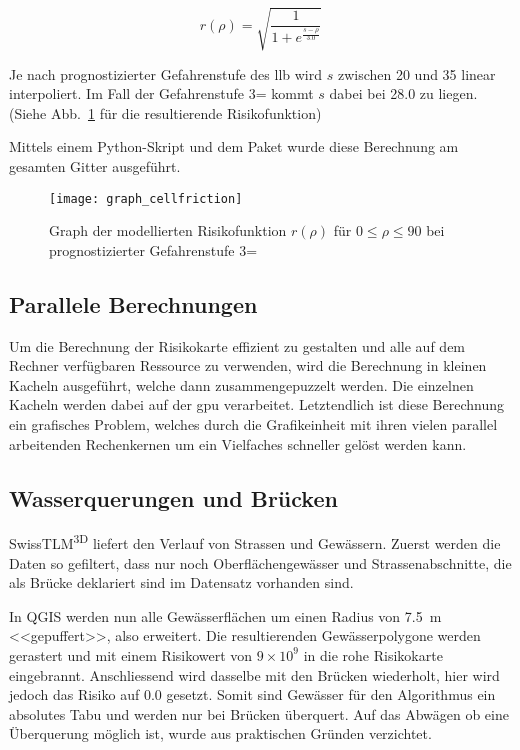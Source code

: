 \[
r(\rho) = \sqrt{\frac{1}{1 + e^{\frac{s-\rho}{3.0}}}}
\]

Je nach prognostizierter Gefahrenstufe des \gls{llb} wird $s$ zwischen 20 und 35 linear interpoliert. Im Fall der Gefahrenstufe 3= kommt $s$ dabei bei 28.0 zu liegen. (Siehe Abb.~\ref{fig:graph} für die resultierende Risikofunktion)

Mittels einem Python-Skript und dem Paket  wurde diese Berechnung am gesamten Gitter ausgeführt.

\begin{figure}[H]
  \centering
  \texttt{[image: graph\_cellfriction]}
  \caption{Graph der modellierten Risikofunktion $r(\rho)$ für $0 \leq \rho \leq 90$ bei prognostizierter Gefahrenstufe 3=}\label{fig:graph}
\end{figure}

\subsection{Parallele Berechnungen}

Um die Berechnung der Risikokarte effizient zu gestalten und alle auf dem Rechner verfügbaren Ressource zu verwenden, wird die Berechnung in kleinen Kacheln ausgeführt, welche dann zusammengepuzzelt werden. Die einzelnen Kacheln werden dabei auf der \acrshort{gpu} verarbeitet. Letztendlich ist diese Berechnung ein grafisches Problem, welches durch die Grafikeinheit mit ihren vielen parallel arbeitenden Rechenkernen um ein Vielfaches schneller gelöst werden kann.

\subsection{Wasserquerungen und Brücken}

SwissTLM\textsuperscript{3D} liefert den Verlauf von Strassen und Gewässern. Zuerst werden die Daten so gefiltert, dass nur noch Oberflächengewässer und Strassenabschnitte, die als Brücke deklariert sind im Datensatz vorhanden sind.

In QGIS werden nun alle Gewässerflächen um einen Radius von \qty{7.5}{m} <<gepuffert>>, also erweitert. Die resultierenden Gewässerpolygone werden gerastert und mit einem Risikowert von $9 \times 10^{9}$ in die rohe Risikokarte eingebrannt. Anschliessend wird dasselbe mit den Brücken wiederholt, hier wird jedoch das Risiko auf $0.0$ gesetzt. Somit sind Gewässer für den Algorithmus ein absolutes Tabu und werden nur bei Brücken überquert. Auf das Abwägen ob eine Überquerung möglich ist, wurde aus praktischen Gründen verzichtet.


